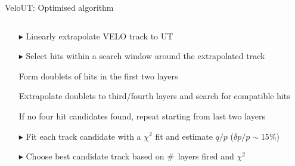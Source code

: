 \documentclass[aspectratio=1610]{beamer}
\begin{document}
\begin{frame}{VeloUT: Optimised algorithm}
\begin{columns}
\begin{column}{0.5\textwidth}
\begin{itemize}
  \item[$\blacktriangleright$] Linearly extrapolate VELO track to UT
  \item[$\blacktriangleright$] Select hits within a search window around the extrapolated track
  \item[\ding{80}] Form doublets of hits in the first two layers
  \item[\ding{80}] Extrapolate doublets to third/fourth layers and search for compatible hits
  \item[\ding{80}] If no four hit candidates found, repeat starting from last two layers
  \item[$\blacktriangleright$] Fit each track candidate with a $\chi^{2}$ fit and estimate $q/p$ ($\delta p/p \sim 15 \%$)
  \item[$\blacktriangleright$] Choose best candidate track based on \mbox{\# layers} fired and $\chi^{2}$
  \end{itemize}
\end{column}
\begin{column}{0.5\textwidth}
\centering

\end{column}
\end{columns}
\end{frame}
\end{document}
